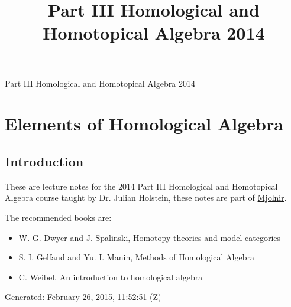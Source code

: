 \documentclass[10pt,]{book}
\title{Part III Homological and Homotopical Algebra 2014}
\author{}
\date{}
\theoremstyle{plain}
\theoremstyle{definition}
\numberwithin{equation}{section}
\begin{document}
\frontmatter
\thispagestyle{empty}
\begin{center}
{\Huge Part III Homological and Homotopical Algebra 2014}
\end{center}\par
{}
\clearpage
\thispagestyle{empty}
\clearpage
\maketitle
\clearpage
\thispagestyle{empty}
\clearpage
\setcounter{tocdepth}{1}
\renewcommand*\contentsname{Contents}
\tableofcontents
\mainmatter
\typeout{************************************************}
\typeout{************************************************}
\chapter[Elements of Homological Algebra]{Elements of Homological Algebra}\label{chap-hom-alg}
\typeout{************************************************}
\typeout{************************************************}
\section[Introduction]{Introduction}\label{sec-introduction}
These are lecture notes for the 2014 Part III Homological and Homotopical Algebra course taught by Dr. Julian Holstein, these notes are part of \href{https://alexjbest.github.io/mjolnir/}{Mjolnir}.%
\par
The recommended books are: 
          \begin{itemize}
\item{}W. G. Dwyer and J. Spalinski, Homotopy theories and model categories\item{}S. I. Gelfand and Yu. I. Manin, Methods of Homological Algebra\item{}C. Weibel, An introduction to homological algebra\end{itemize}

\par

          Generated: February 26, 2015, 11:52:51 (Z)
\typeout{************************************************}
\typeout{************************************************}
\end{document}
